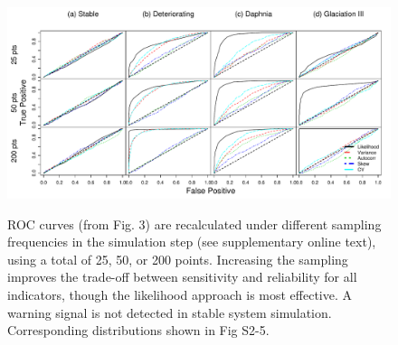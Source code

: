 \documentclass[authoryear,preprint,11pt]{elsarticle}
\begin{document}
 \begin{figure}[h!]
   \begin{center}
     \includegraphics[width=\linewidth]{Fig4.pdf}
     \label{fig4}
     \caption{ROC curves (from Fig. 3) are recalculated under different sampling frequencies in the simulation step (see supplementary online text), using a total of 25, 50, or 200 points.  Increasing the sampling improves the trade-off between sensitivity and reliability for all indicators, though the likelihood approach is most effective. A warning signal is not detected in stable system simulation. Corresponding distributions shown in Fig S2-5.} 
  \end{center}
 \end{figure}

 
\end{document}
